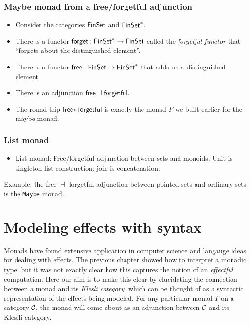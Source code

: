 \subsection{Maybe monad from a free/forgetful adjunction}
\begin{itemize}
    \item Consider the categories $\mathsf{FinSet}$ and $\mathsf{FinSet}^*$.
    \item There is a functor $\mathsf{forget} : \mathsf{FinSet}^* \to \mathsf{FinSet}$ 
    called the \emph{forgetful functor} that ``forgets about the distinguished element''. 
    \item There is a functor $\mathsf{free} : \mathsf{FinSet} \to \mathsf{FinSet}^*$ that adds on 
    a distinguished element
    \item There is an adjunction $\mathsf{free} \dashv \mathsf{forgetful}$.
    \item The round trip $\mathsf{free} \circ \mathsf{forgetful}$ is exactly 
    the monad $F$ we built earlier for the maybe monad.

\end{itemize}

\subsection{List monad}

\begin{itemize}
    \item List monad: Free/forgetful adjunction between sets and monoids.
    Unit is singleton list construction; join is concatenation.
\end{itemize}
Example: the free $\dashv$ forgetful adjunction between 
pointed sets and ordinary sets is the \texttt{Maybe} monad.


\chapter{Modeling effects with syntax}
Monads have found extensive application in computer science and langauge ideas 
for dealing with effects. The previous chapter showed how to interpret 
a monadic type, but it was not exactly clear how this captures the notion 
of an \emph{effectful} computation. Here our aim is to make this clear by 
elucidating the connection between a monad and its
\emph{Klesli category}, which can be thought of as a syntactic representation 
of the effects being modeled. For any particular monad $T$ on a category 
$\mathcal C$, the monad will come about as an adjunction between $\mathcal C$ 
and its Klesili category.

